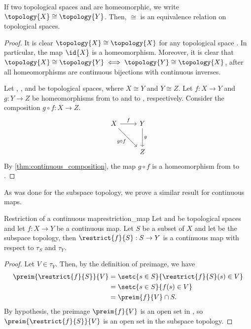 \begin{corollary}
    If two topological spaces  and  are homeomorphic, we write \(\topology{X} \cong \topology{Y}\). Then, \(\cong\) is an equivalence relation on topological spaces.
\end{corollary}
\begin{proof}
    It is clear \(\topology{X} \cong \topology{X}\) for any topological space . In particular, the map \(\id{X}\) is a homeomorphism. Moreover, it is clear that \(\topology{X} \cong \topology{Y} \iff \topology{Y} \cong \topology{X}\), after all homeomorphisms are continuous bijections with continuous inverses.

    Let , , and  be topological spaces, where \(X \cong Y\) and \(Y \cong Z\). Let \(f : X \to Y\) and \(g : Y \to Z\) be homeomorphisms from  to  and  to , respectively. Consider the composition \(g\circ f : X \to Z\).
    \begin{equation*}
        \begin{tikzcd}[column sep = normal, row sep = large]
            X \arrow{r}{f} \arrow[swap]{dr}{g\circ f} & Y \arrow{d}{g} \\
                                                      & Z
        \end{tikzcd}
    \end{equation*}
    By \cref{thm:continuous_composition}, the map \(g\circ f\) is a homeomorphism from  to .
\end{proof}

As was done for the subspace topology, we prove a similar result for continuous maps.
\begin{proposition}{Restriction of a continuous map}{restriction_map}
    Let  and  be topological spaces and let \(f : X \to Y\) be a continuous map. Let \(S\) be a subset of \(X\) and let  be the subspace topology, then \(\restrict{f}{S} : S \to Y\) is a continuous map with respect to \(\tau_S\) and \(\tau_Y\).
\end{proposition}
\begin{proof}
    Let \(V \in \tau_Y\). Then, by the definition of preimage, we have
    \begin{align*}
        \preim{\restrict{f}{S}}{V} &= \setc{s \in S}{\restrict{f}{S}(s) \in V}\\
                                &= \setc{s \in S}{f(s) \in V}\\
                                &= \preim{f}{V} \cap S.
    \end{align*}
    By hypothesis, the preimage \(\preim{f}{V}\) is an open set in , so \(\preim{\restrict{f}{S}}{V}\) is an open set in the subspace topology.
\end{proof}

